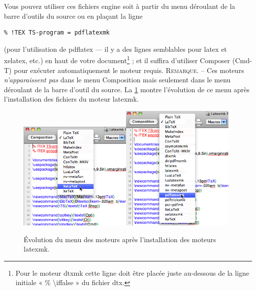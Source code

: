 \documentclass[11pt,french]{article}
\newcommand{\latexmk}{\textsf{latexmk}}
\newcommand{\cmdkey}{\textsf{Cmd}}
\newcommand{\mnu}[1]{\textsf{#1}}
\newcommand{\cmd}[1]{\textsf{#1}}
\begin{document}
Vous pouvez utiliser ces fichiers \cmd{engine} soit à partir du menu déroulant de la barre d'outils du source ou en plaçant la ligne
\begin{verbatim}
% !TEX TS-program = pdflatexmk
\end{verbatim}
(pour l'utilisation de \cmd{pdflatex} --- il y a des lignes semblables pour \cmd{latex} et \cmd{xelatex}, etc.) en haut de votre document\footnote{Pour le moteur \cmd{dtxmk} cette ligne doit être placée juste au-dessous de la ligne initiale « \cmd{\% \textbackslash iffalse} » du fichier \cmd{dtx}.} ; et il suffira d'utiliser \mnu{Composer} (\cmd{\cmdkey-T}) pour exécuter automatiquement le moteur requis. \textsc{Remarque}. -- Ces moteurs \emph{n'apparaissent pas} dans le menu \mnu{Composition} mais seulement dans le menu déroulant de la barre d'outil du source. La \cref{popupmenus} montre l'évolution de ce menu après l'installation des fichiers du moteur \latexmk.

\begin{figure}
\centering
\includegraphics[width=5.5cm]{figs/avant}\qquad\includegraphics[width=5.5cm]{figs/apres}
\caption{Évolution du menu des moteurs après l'installation des moteurs \latexmk.\label{popupmenus}}
\end{figure}
\end{document}
